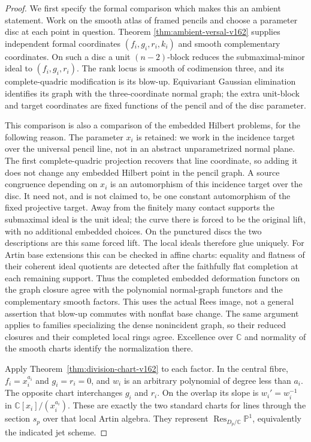 \documentclass[11pt,reqno]{amsart}
\numberwithin{equation}{section}
\theoremstyle{definition}\newtheorem{definition}[theorem]{Definition}
\theoremstyle{remark}\newtheorem{remark}[theorem]{Remark}
\newcommand{\C}{\mathbb C}\newcommand{\Q}{\mathbb Q}
\newcommand{\Pj}{\mathbb P}\newcommand{\A}{\mathbb A}
\begin{document}
\begin{proof}
We first specify the formal comparison which makes this an ambient
statement. Work on the smooth atlas of framed pencils and choose
a parameter disc at each point in question. Theorem
\ref{thm:ambient-versal-v162} supplies independent formal coordinates
$(f_i,g_i,r_i,k_i)$ and smooth complementary coordinates. On such
a disc a unit $(n-2)$-block reduces the submaximal-minor ideal to
$(f_i,g_i,r_i)$. The rank locus is smooth of codimension three, and
its complete-quadric modification is its blow-up. Equivariant
Gaussian elimination identifies its graph with the three-coordinate
normal graph; the extra unit-block and target coordinates are fixed
functions of the pencil and of the disc parameter.

This comparison is also a comparison of the embedded Hilbert
problems, for the following reason. The parameter $x_i$ is retained:
we work in the incidence target over the universal pencil line,
not in an abstract unparametrized normal plane. The first
complete-quadric projection recovers that line coordinate, so adding
it does not change any embedded Hilbert point in the pencil graph.
A source congruence depending on $x_i$ is an automorphism of this
incidence target over the disc. It need not, and is not claimed to,
be one constant automorphism of the fixed projective target.
Away from the finitely many contact supports the submaximal ideal
is the unit ideal; the curve there is forced to be the original
lift, with no additional embedded choices. On the punctured discs
the two descriptions are this same forced lift. The local ideals
therefore glue uniquely. For Artin base extensions this can be
checked in affine charts: equality and flatness of their coherent
ideal quotients are detected after the faithfully flat completion
at each remaining support. Thus the completed embedded deformation
functors on the graph closure agree with the polynomial normal-graph
functors and the complementary smooth factors. This uses the
actual Rees image, not a general assertion that blow-up commutes
with nonflat base change. The same argument applies to families
specializing the dense nonincident graph, so their reduced closures
and their completed local rings agree. Excellence over $\C$ and
normality of the smooth charts identify the normalization there.

Apply Theorem~\ref{thm:division-chart-v162} to each factor. In the
central fibre, $f_i=x_i^{a_i}$ and $g_i=r_i=0$, and $w_i$ is an
arbitrary polynomial of degree less than $a_i$. The opposite chart
interchanges $g_i$ and $r_i$. On the overlap its slope is
$w_i'=w_i^{-1}$ in $\C[x_i]/(x_i^{a_i})$. These are exactly the
two standard charts for lines through the section $s_p$ over that
local Artin algebra. They represent
$\operatorname{Res}_{D_p/\C}\Pj^1$, equivalently the indicated jet
scheme.


\end{proof}
\end{document}
